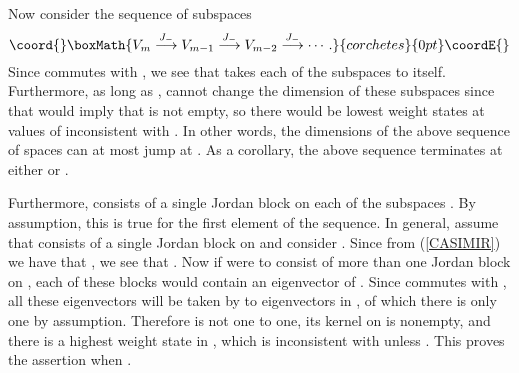 \documentclass[a4paper,dvips,12pt]{article}
\begin{document}
    Now consider the sequence of subspaces
    \[\coord{}\boxMath{
        V_m \stackrel{J_-}{\longrightarrow} V_{m-1} \stackrel{J_-}{\longrightarrow}
        V_{m-2} \stackrel{J_-}{\longrightarrow} \cdots.
    }{corchetes}{0pt}\coordE{}\]
    Since \coordHE{} commutes with \coordHE{}, we see that
    \coordHE{} takes each of the subspaces \coordHE{} to
    itself.  Furthermore, as long as \coordHE{}, \coordHE{}
    cannot change the dimension of these subspaces since that
    would imply that \coordHE{} is not empty, so there would be
    lowest weight states at values of \coordHE{} inconsistent with \coordHE{}.
    In other words, the dimensions of the above sequence of spaces
    \coordHE{} can at most jump at \coordHE{}.
    As a corollary, the above sequence terminates at either \coordHE{} or \coordHE{}.

    Furthermore, \coordHE{} consists of a single
    Jordan block on each of the subspaces \coordHE{}.
    By assumption, this is true for the first element \coordHE{}
    of the sequence.  In general, assume that \coordHE{} consists of a
    single Jordan block on \coordHE{} and consider \coordHE{}.  Since from (\ref{CASIMIR})
    we have that \coordHE{}, we see that \coordHE{}.  Now if \coordHE{}
    were to consist of more than one Jordan block on \coordHE{}, each
    of these blocks would contain an eigenvector of \coordHE{}.
    Since \coordHE{} commutes with \coordHE{}, all these
    eigenvectors will be taken by \coordHE{} to eigenvectors in \coordHE{},
    of which there is only one by assumption.
    Therefore \coordHE{} is not one to one, its
    kernel on \coordHE{} is nonempty, and there is a highest weight
    state in \coordHE{}, which is inconsistent with \coordHE{} unless
    \coordHE{}.  This proves the assertion when
    \coordHE{}.
\end{document}
